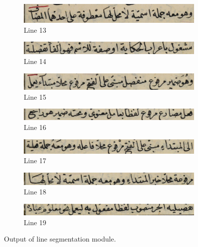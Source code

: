 \begin{figure}[H]
     \begin{subfigure}[b]{0.3\textwidth}
         \centering
         \includegraphics[width=\textwidth]{images/lines/_13.png}
         \caption{Line 13}
     \end{subfigure}
     \hfill%
     \begin{subfigure}[b]{0.3\textwidth}
         \centering
         \includegraphics[width=\textwidth]{images/lines/_14.png}
         \caption{Line 14}
     \end{subfigure}
     \hfill%
     \begin{subfigure}[b]{0.3\textwidth}
         \centering
         \includegraphics[width=\textwidth]{images/lines/_15.png}
         \caption{Line 15}
     \end{subfigure}
     \hfill%
     \begin{subfigure}[b]{0.3\textwidth}
         \centering
         \includegraphics[width=\textwidth]{images/lines/_16.png}
         \caption{Line 16}
     \end{subfigure}
     \hfill%
     \begin{subfigure}[b]{0.3\textwidth}
         \centering
         \includegraphics[width=\textwidth]{images/lines/_17.png}
         \caption{Line 17}
     \end{subfigure}
     \hfill%
     \begin{subfigure}[b]{0.3\textwidth}
         \centering
         \includegraphics[width=\textwidth]{images/lines/_18.png}
         \caption{Line 18}
     \end{subfigure}
     \hfill%
     \begin{subfigure}[b]{0.3\textwidth}
         \centering
         \includegraphics[width=\textwidth]{images/lines/_19.png}
         \caption{Line 19}
     \end{subfigure}
    \caption{Output of line segmentation module.}
    \label{fig:line-segmentation-results}
\end{figure}


